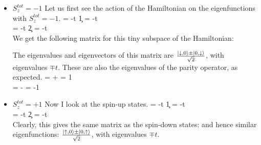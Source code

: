\documentclass[12pt]{article}
\begin{document}
\begin{itemize}

\item{\(S_z^{tot} = -1\)}
Let us first see the action of the Hamiltonian on the eigenfunctions with \(S_z^{tot} = -1\).
\beq
\ham{} = -t \c{1}{\downarrow} = -t \\
\ham{} = -t \c{2}{\downarrow} = -t \\
\eeq
We get the following matrix for this tiny subspace of the Hamiltonian:
\beq
{}
\eeq

The eigenvalues and eigenvectors of this matrix are \(\frac{\ket{\downarrow,0} \pm \ket{0,\downarrow}}{\sqrt{2}}\), with eigenvalues \(\mp t\). These are also the eigenvalues of the parity operator, as expected.
\beq
{} =  +  \implies {} = 1 \\
 =  -  \implies {} = -1
\eeq

\item{\(S_z^{tot} = +1\)}
Now I look at the spin-up states.
\beq
\ham{} = -t \c{1}{\uparrow} = -t \\
\ham{} = -t \c{2}{\uparrow} = -t \\
\eeq
Clearly, this gives the same matrix as the spin-down states:
\beq
{}
\eeq
and hence similar eigenfunctions: \(\frac{\ket{\uparrow,0} \pm \ket{0,\uparrow}}{\sqrt{2}}\), with eigenvalues \(\mp t\).
\end{itemize}
\end{document}
